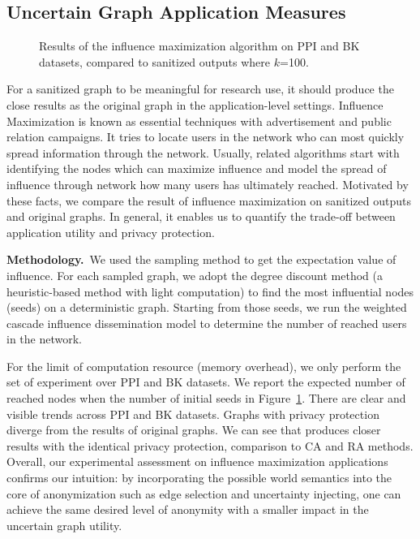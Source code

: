 \subsection{Uncertain Graph Application Measures}
\begin{figure}[!htb]
    \centering
    \caption{ Results of the influence maximization algorithm on PPI and BK datasets, compared to sanitized outputs where $k$=100.}
    \vspace{-15pt}
    \label{fig:IM}
\end{figure} 
For a sanitized graph to be meaningful for research use, it should produce 
the close results as the original graph in the application-level settings. 
Influence Maximization is known as essential techniques with advertisement and public relation campaigns.
It tries to locate users in the network who can most quickly spread information through the network. 
Usually, related algorithms start with identifying the nodes which can maximize influence and model the spread of influence through network how many users has ultimately reached.  
Motivated by these facts, we compare the result of influence maximization on sanitized outputs and original graphs. 
In general, it enables us to quantify the trade-off between application utility and privacy protection. 

\textbf{Methodology.}~We used the sampling method to get the expectation value of influence. For each sampled graph, we adopt the degree discount method (a heuristic-based method with light computation) to find the most influential nodes (seeds) on a deterministic graph. Starting from those seeds, we run the weighted cascade influence dissemination model to determine the number of reached users in the network. 

For the limit of computation resource (memory overhead), we only perform the set of experiment over PPI and BK datasets. We report the expected number of reached nodes when the number of initial seeds in Figure~\ref{fig:IM}. 
There are clear and visible trends across PPI and BK datasets. 
Graphs with privacy protection diverge from the results of original graphs.
We can see that {\methodName} produces closer results with the identical privacy protection, comparison to CA and RA methods. 
Overall, our experimental assessment on influence maximization applications confirms our intuition: by incorporating the possible world semantics into the core of anonymization such as edge selection and uncertainty injecting, one can achieve the same desired level of anonymity with a smaller impact in the uncertain graph utility.  